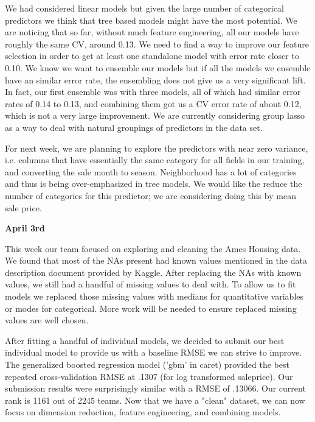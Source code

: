 \documentclass[12pt]{article}
\begin{document}
We had considered linear models but given the large number of categorical predictors we think that tree based models might have the most potential.  We are noticing that so far, without much feature engineering, all our models have roughly the same CV, around 0.13.  We need to find a way to improve our feature selection in order to get at least one standalone model with error rate closer to 0.10.  We know we want to ensemble our models but if all the models we ensemble have an similar error rate, the ensembling does not give us a very significant lift.  In fact, our first ensemble was with three models, all of which had similar error rates of 0.14 to 0.13, and combining them got us a CV error rate of about 0.12, which is not a very large improvement.  We are currently considering group lasso as a way to deal with natural groupings of predictors in the data set.

For next week, we are planning to explore the predictors with near zero variance, i.e. columns that have essentially the same category for all fields in our training, and converting the sale month to season.  Neighborhood has a lot of categories and thus is being over-emphasized in tree models.  We would like the reduce the number of categories for this predictor; we are considering doing this by mean sale price.

\newpage
\textbf{April 3rd}

This week our team focused on exploring and cleaning the Ames Housing data. We found that most of the NAs present had known values mentioned in the data description document provided by Kaggle. After replacing the NAs with known values, we still had a handful of missing values to deal with. To allow us to fit models we replaced those missing values with medians for quantitative variables or modes for categorical. More work will be needed to ensure replaced missing values are well chosen.

After fitting a handful of individual models, we decided to submit our best individual model to provide us with a baseline RMSE we can strive to improve. The generalized boosted regression model ('gbm' in caret) provided the best repeated cross-validation RMSE at .1307 (for log transformed saleprice). Our submission results were surprisingly similar with a RMSE of .13066. Our current rank is 1161 out of 2245 teams. Now that we have a "clean" dataset, we can now focus on dimension reduction, feature engineering, and combining models.
\end{document}

